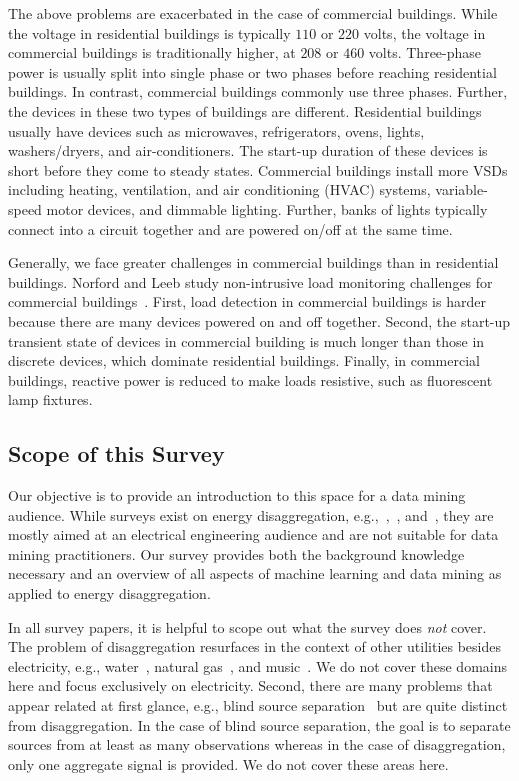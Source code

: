 The above problems are exacerbated in the case of commercial buildings.
While the voltage in residential buildings is typically $110$ or $220$ volts, 
the voltage in commercial buildings is
traditionally higher, at $208$ or $460$ volts.
Three-phase power is usually split
into single phase or two phases before reaching residential buildings.
In contrast, commercial buildings commonly use three phases.
Further, the devices in these two types of buildings are different.
Residential buildings
usually have devices such as microwaves,
refrigerators, ovens, lights, washers/dryers, and
air-conditioners.
The start-up duration of these devices
is short before they come to steady states.
Commercial buildings install more VSDs
including heating, ventilation, and air conditioning (HVAC) systems, 
variable-speed motor devices, and dimmable lighting. 
Further, banks of lights typically connect into a circuit together and
are powered on/off at the same time.

Generally, we face greater challenges in commercial buildings
than in residential buildings.
Norford and Leeb study non-intrusive load monitoring
challenges for commercial buildings~\cite{norford1996non}.
First,  load detection in commercial buildings is harder
because there are many devices powered on and off together.
Second, the start-up transient state of devices in commercial building is
much longer than those in discrete devices,
which dominate residential buildings.
Finally, in commercial buildings, reactive power is reduced to
make loads resistive, such as fluorescent lamp fixtures.


\subsection{Scope of this Survey}
Our objective is to provide an introduction to this space for a data
mining audience. While surveys exist on energy disaggregation,
e.g.,~\cite{zeifman2011nonintrusive},~\cite{liang2010load}, and~\cite{zoha2012survey}, they are mostly aimed at an electrical engineering audience and are
not suitable for data mining practitioners. Our survey provides both 
the background knowledge necessary and an overview of all aspects of
machine learning and data mining as applied to energy disaggregation.

In all survey papers, it is helpful to scope out what the survey does {\it not}
cover. The problem of disaggregation resurfaces in the
context of other utilities besides electricity, e.g.,
water~\cite{dai2011multi}, 
natural gas~\cite{froehlich2011disaggregated}, and music~\cite{schmidt2006nonnegative}. We do not cover these domains here and focus exclusively on electricity.
Second, there are many problems that appear related at first glance,
e.g., blind source separation~\cite{blumensath2005shift,davies2007source,lewicki2000learning} but are quite distinct from disaggregation. In the case of blind
source separation, the goal is to separate sources from at least as many
observations whereas in the case of disaggregation, only one aggregate signal
is provided. We do not cover these areas here.

